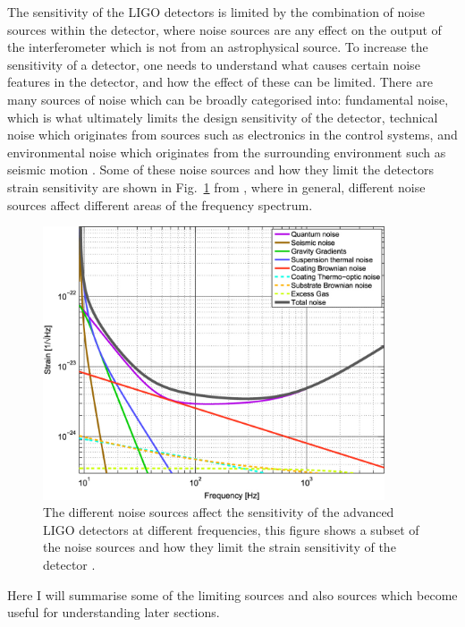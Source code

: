 The sensitivity of the \gls{LIGO} detectors is limited by the combination of
noise sources within the detector, where noise sources are any effect on the
output of the interferometer which is not from an astrophysical source.  To
increase the sensitivity of a detector, one needs to understand what causes
certain noise features in the detector, and how the effect of these can be
limited.  There are many sources of noise which can be broadly categorised
into: fundamental noise, which is what ultimately limits the design sensitivity
of the detector, technical noise which originates from sources such as
electronics in the control systems, and environmental noise which originates
from the surrounding environment such as seismic motion
\citep{martynov2016SensitivityAdvanced}.  Some of these noise sources and how
they limit the detectors strain sensitivity are shown in
Fig.~\ref{detectors:noisesensitivity} from \citep{aasi2015AdvancedLIGO}, where
in general, different noise sources affect different areas of the frequency
spectrum.

\begin{figure}[h]
    \centering
    \includegraphics[width=0.9\textwidth]{C1_intro/noise_sensitivity.jpg}
    \caption[Example strain sensitivity curves for different noise sources in
\gls{LIGO}.]{The different noise sources affect the sensitivity of the
advanced \gls{LIGO} detectors at different frequencies, this figure shows a subset of the noise sources and how they limit the strain sensitivity of the detector \citep{aasi2015AdvancedLIGO}.}
\label{detectors:noisesensitivity} 
\end{figure}

Here I will summarise some of the limiting sources and also sources which
become useful for understanding later sections.

